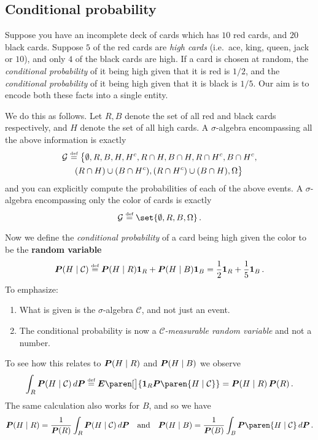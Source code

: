 \subsection{Conditional probability}

Suppose you have an incomplete deck of cards which has $10$ red cards, and $20$ black cards.
Suppose $5$ of the red cards are \emph{high cards} (i.e.\ ace, king, queen, jack or $10$), and only $4$ of the black cards are high.
If a card is chosen at random, the \emph{conditional probability} of it being high given that it is red is $1/2$, and the \emph{conditional probability} of it being high given that it is black is $1/5$.
Our aim is to encode both these facts into a single entity.

We do this as follows.
Let $R, B$ denote the set of all red and black cards respectively, and $H$ denote the set of all high cards.
A $\sigma$-algebra encompassing all the above information is exactly
\begin{multline*}
  \mathcal G \stackrel{\scriptscriptstyle\textup{def}}{=}
    \bigl\{\emptyset, R, B, H, H^c, R\cap H, B\cap H, R\cap H^c, B\cap H^c,
      \\
      (R\cap H) \cup (B\cap H^c), (R\cap H^c) \cup (B\cap H), \Omega \bigr\}\,
\end{multline*}
and you can explicitly compute the probabilities of each of the above events.
A $\sigma$-algebra encompassing only the color of cards is exactly
\begin{equation*}
  \mathcal G \defeq \set{ \emptyset, R, B, \Omega }\,.
\end{equation*}

Now we define the \emph{conditional probability} of a card being high given the color to be the \textbf{random variable}
\begin{equation*}
  \P( H \given \mathcal C )
    \defeq \P(H \given R) \one_R + \P(H \given B) \one_B
    = \frac{1}{2} \one_R + \frac{1}{5} \one_B\,.
\end{equation*}
To emphasize:
\begin{enumerate}
  \item
    What is given is the $\sigma$-algebra $\mathcal C$, and not just an event.
  \item
    The conditional probability is now a \emph{$\mathcal C$-measurable random variable} and not a number.
\end{enumerate}

To see how this relates to $\P(H \given R)$ and $\P(H \given B)$ we observe
\begin{equation*}
  \int_R \P( H \given \mathcal C ) \, d\P
  \defeq \E \paren[\big]{ \one_R \P\paren{ H \given \mathcal C } }
  = \P( H \given R) \, \P(R) \,.
\end{equation*}
The same calculation also works for $B$, and so we have
\begin{equation*}
  \P( H \given R )
    = \frac{1}{\P(R)} \int_R \P( H \given \mathcal C ) \, d\P
  \quad\text{and}\quad
  \P( H \given B )
    = \frac{1}{\P(B)} \int_B \P\paren{ H \given \mathcal C } \, d\P\,.
\end{equation*}

